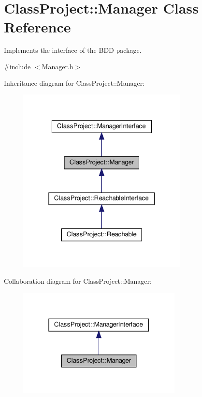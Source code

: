 \hypertarget{classClassProject_1_1Manager}{}\section{Class\+Project\+:\+:Manager Class Reference}
\label{classClassProject_1_1Manager}


Implements the interface of the B\+DD package.  




{\ttfamily \#include $<$Manager.\+h$>$}



Inheritance diagram for Class\+Project\+:\+:Manager\+:
\nopagebreak
\begin{figure}[H]
\begin{center}
\leavevmode
\includegraphics[width=244pt]{classClassProject_1_1Manager__inherit__graph}
\end{center}
\end{figure}


Collaboration diagram for Class\+Project\+:\+:Manager\+:
\nopagebreak
\begin{figure}[H]
\begin{center}
\leavevmode
\includegraphics[width=235pt]{classClassProject_1_1Manager__coll__graph}
\end{center}
\end{figure}
